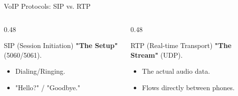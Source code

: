 \documentclass[aspectratio=169]{beamer}  %
\begin{document}
\begin{frame}{VoIP Protocols: SIP vs. RTP}
    \begin{columns}[T]
        \begin{column}{0.48\textwidth}
            \begin{block}{SIP (Session Initiation)}
                \small
                \textbf{"The Setup"} (5060/5061).
                \begin{itemize}
                    \item Dialing/Ringing.
                    \item "Hello?" / "Goodbye."
                \end{itemize}
            \end{block}
        \end{column}
        \begin{column}{0.48\textwidth}
            \begin{block}{RTP (Real-time Transport)}
                \small
                \textbf{"The Stream"} (UDP).
                \begin{itemize}
                    \item The actual audio data.
                    \item Flows directly between phones.
                \end{itemize}
            \end{block}
        \end{column}
    \end{columns}
    \begin{center}
    \end{center}
\end{frame}
\end{document}

